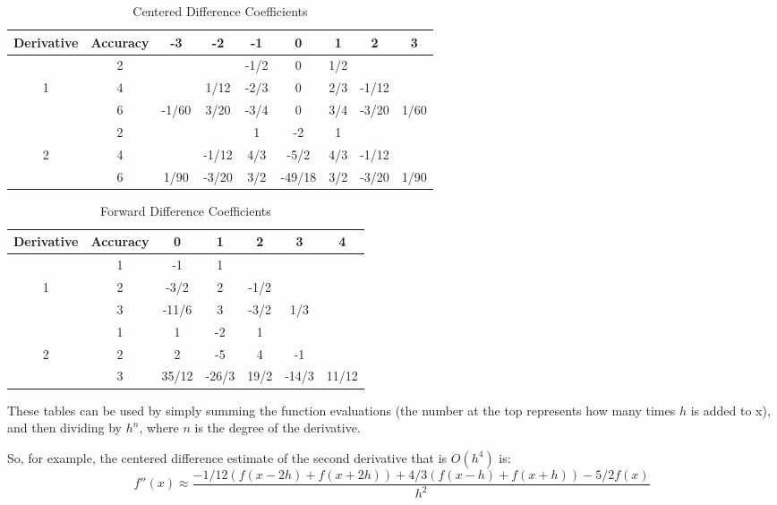 \begin{table}[h!]
\begin{center}
\begin{tabular}{|c|c|c|c|c|c|c|c|c|}
\hline
Derivative & Accuracy & -3 & -2 & -1 & 0 & 1 & 2 & 3 \\ \hline
 & 2 & & & -1/2 & 0 & 1/2 & & \\ \cline{2-9}
 1 & 4 & & 1/12 & -2/3 &  0 & 2/3 & -1/12 & \\ \cline{2-9}
  & 6 & -1/60 & 3/20 & -3/4 & 0 & 3/4 & -3/20 & 1/60 \\ \hline
  & 2 & & & 1 & -2 & 1 & & \\ \cline{2-9}
 2 & 4 & & -1/12 & 4/3 &  -5/2 & 4/3 & -1/12 & \\ \cline{2-9}
  & 6 & 1/90 & -3/20 & 3/2 & -49/18 & 3/2 & -3/20 & 1/90 \\ \hline
\end{tabular}
\caption{Centered Difference Coefficients}
\end{center}
\end{table}

\begin{table}[h!]
\begin{center}
\begin{tabular}{|c|c|c|c|c|c|c|}
\hline
Derivative & Accuracy & 0 & 1 & 2 & 3 & 4 \\ \hline
 & 1 & -1 & 1 &  & &  \\ \cline{2-7}
 1 & 2 & -3/2 & 2 & -1/2 & &  \\ \cline{2-7}
  & 3 & -11/6 & 3 & -3/2 & 1/3 &  \\ \hline
  & 1 & 1 & -2 & 1 &  & \\ \cline{2-7}
 2 & 2 & 2 & -5 & 4 &  -1 &  \\ \cline{2-7}
  & 3 & 35/12 & -26/3 & 19/2 & -14/3 & 11/12 \\ \hline
\end{tabular}
\caption{Forward Difference Coefficients}
\end{center}
\end{table}

These tables can be used by simply summing the function evaluations (the number at the top represents how many times $h$ is added to x), and then dividing by $h^n$, where $n$ is the degree of the derivative.

So, for example, the centered difference estimate of the second derivative that is $O(h^4)$ is:
\[
f''(x) \approx \frac{-1/12(f(x-2h) + f(x+2h)) + 4/3(f(x-h) + f(x+h)) -5/2f(x)}{h^2}
\]

